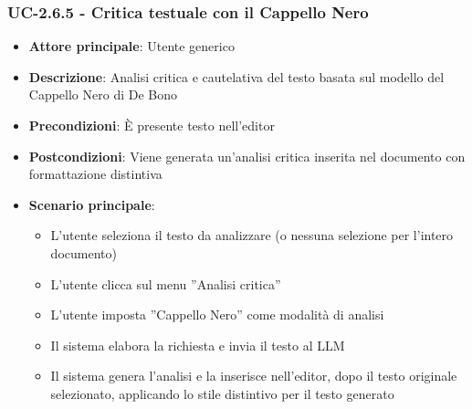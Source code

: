 \documentclass[11pt,a4paper]{article}
\begin{document}
\subsubsection{UC-2.6.5 - Critica testuale con il Cappello Nero}
\begin{itemize}
    \item \textbf{Attore principale}: Utente generico
    \item \textbf{Descrizione}: Analisi critica e cautelativa del testo basata sul modello del Cappello Nero di De Bono
    \item \textbf{Precondizioni}: È presente testo nell’editor
    \item \textbf{Postcondizioni}: Viene generata un’analisi critica inserita nel documento con formattazione distintiva
    \item \textbf{Scenario principale}:
    \begin{itemize}
        \item L’utente seleziona il testo da analizzare (o nessuna selezione per l'intero documento)
        \item L’utente clicca sul menu ”Analisi critica”
        \item L’utente imposta ”Cappello Nero” come modalità di analisi
        \item Il sistema elabora la richiesta e invia il testo al LLM
        \item Il sistema genera l'analisi e la inserisce nell'editor, dopo il testo originale selezionato, applicando lo stile distintivo per il testo generato
    \end{itemize}
\end{itemize}
\end{document}
